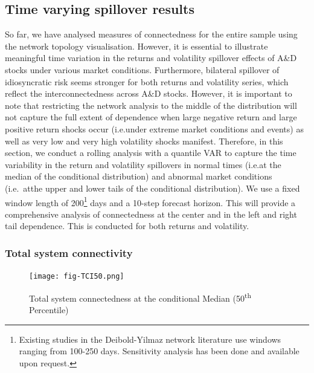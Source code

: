 \documentclass[
  letterpaper,
  DIV=11,
  numbers=noendperiod]{scrartcl}
\begin{document}
\hypertarget{time-varying-spillover-results}{%
\subsection{Time varying spillover
results}\label{time-varying-spillover-results}}

So far, we have analysed measures of connectedness for the entire sample
using the network topology visualisation. However, it is essential to
illustrate meaningful time variation in the returns and volatility
spillover effects of A\&D stocks under various market conditions.
Furthermore, bilateral spillover of idiosyncratic risk seems stronger
for both returns and volatility series, which reflect the
interconnectedness across A\&D stocks. However, it is important to note
that restricting the network analysis to the middle of the distribution
will not capture the full extent of dependence when large negative
return and large positive return shocks occur (i.e.under extreme market
conditions and events) as well as very low and very high volatility
shocks manifest. Therefore, in this section, we conduct a rolling
analysis with a quantile VAR to capture the time variability in the
return and volatility spillovers in normal times (i.e.at the median of
the conditional distribution) and abnormal market conditions (i.e.~atthe
upper and lower tails of the conditional distribution). We use a fixed
window length of 200\footnote{Existing studies in the Deibold-Yilmaz
  network literature use windows ranging from 100-250 days. Sensitivity
  analysis has been done and available upon request.} days and a 10-step
forecast horizon. This will provide a comprehensive analysis of
connectedness at the center and in the left and right tail dependence.
This is conducted for both returns and volatility.

\hypertarget{total-system-connectivity}{%
\subsubsection{Total system
connectivity}\label{total-system-connectivity}}

\begin{figure}[H]

{\centering \texttt{[image: fig-TCI50.png]}

}

\caption{\label{fig-TCI50}Total system connectedness at the conditional
Median (50\textsuperscript{th} Percentile)}

\end{figure}
\end{document}
